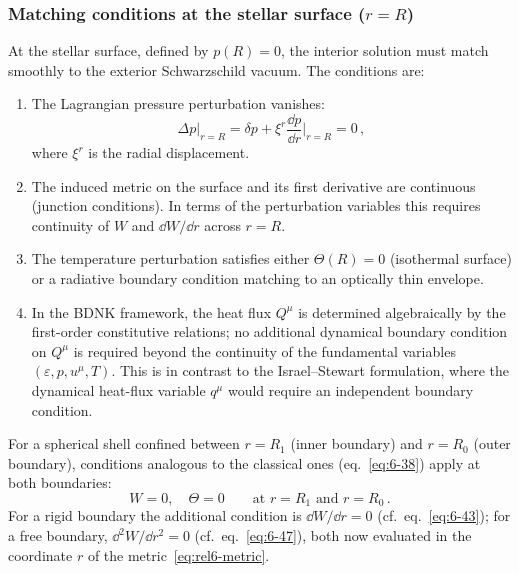 \subsubsection{Matching conditions at the stellar surface ($r = R$)}
At the stellar surface, defined by $p(R) = 0$, the interior solution
must match smoothly to the exterior Schwarzschild vacuum.  The
conditions are:
\begin{enumerate}
\item[(i)] The Lagrangian pressure perturbation vanishes:
  \begin{equation}
    \Delta p\big|_{r=R}
    = \delta p + \xi^{r}\frac{\dd p}{\dd r}\bigg|_{r=R} = 0 \,,
    \label{eq:rel6-bc-surface-p}
  \end{equation}
  where $\xi^{r}$ is the radial displacement.

\item[(ii)] The induced metric on the surface and its first derivative
  are continuous (junction conditions).  In terms of the perturbation
  variables this requires continuity of $W$ and $\dd W/\dd r$ across
  $r = R$.

\item[(iii)] The temperature perturbation satisfies either
  $\Theta(R) = 0$ (isothermal surface) or a radiative boundary
  condition matching to an optically thin envelope.

\item[(iv)] In the BDNK framework, the heat flux $Q^{\mu}$ is
  determined algebraically by the first-order constitutive relations;
  no additional dynamical boundary condition on $Q^{\mu}$ is required
  beyond the continuity of the fundamental variables
  $(\varepsilon, p, u^{\mu}, T)$.  This is in contrast to the
  Israel--Stewart formulation, where the dynamical heat-flux
  variable $q^{\mu}$ would require an independent boundary condition.
\end{enumerate}

\noindent
For a spherical shell confined between $r = R_{1}$ (inner boundary) and
$r = R_{0}$ (outer boundary), conditions analogous to the classical ones
(eq.~\eqref{eq:6-38}) apply at both boundaries:
\begin{equation}
  W = 0, \quad \Theta = 0
  \qquad\text{at } r = R_{1} \text{ and } r = R_{0} \,.
  \label{eq:rel6-bc-shell}
\end{equation}
For a rigid boundary the additional condition is
$\dd W/\dd r = 0$ (cf.\ eq.~\eqref{eq:6-43}); for a free boundary,
$\dd^{2}W/\dd r^{2} = 0$ (cf.\ eq.~\eqref{eq:6-47}), both now
evaluated in the coordinate $r$ of the metric~\eqref{eq:rel6-metric}.

